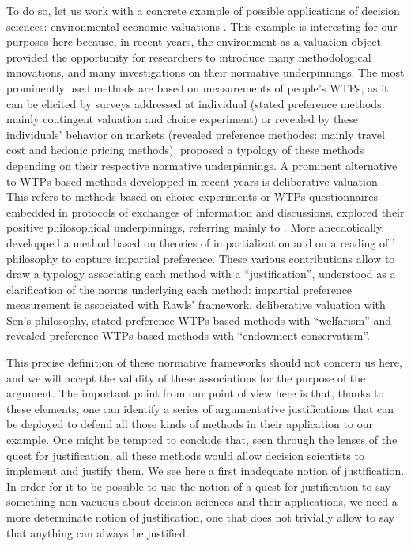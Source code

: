 \documentclass[preprint, french, english, 11pt, authoryear]{elsarticle}%
\begin{document}
To do so, let us work with a concrete example of possible applications of decision sciences: environmental economic valuations \citep{kontoleon_biodiversity_2007}. This example is interesting for our purposes here because, in recent years, the environment as a valuation object provided the opportunity for researchers to introduce many methodological innovations, and many investigations on their normative underpinnings. The most prominently used methods are based on measurements of people's \acp{WTP}, as it can be elicited by surveys addressed at individual (stated preference methods: mainly contingent valuation and choice experiment) or revealed by these individuals' behavior on markets (revealed preference methodes: mainly travel cost and hedonic pricing methods). \citet{meinard_ethical_2016} proposed a typology of these methods depending on their respective normative underpinnings. A prominent alternative to \acp{WTP}-based methods developped in recent years is deliberative valuation \citep{bartkowski_economic_2017}. This refers to methods based on choice-experiments or \acp{WTP} questionnaires embedded in protocols of exchanges of information and discussions. \citet{bartkowski_beyond_2018} explored their positive philosophical underpinnings, referring mainly to \citet{sen_idea_2009}. More anecdotically, \citet{meinard_measuring_2017} developped a method based on theories of impartialization \citep{kolm_macrojustice:_2004}and on a reading of \citet{rawls_theory_1999}' philosophy to capture impartial preference. These various contributions allow to draw a typology associating each method with a ``justification'', understood as a clarification of the norms underlying each method: impartial preference measurement is associated with Rawls' framework, deliberative valuation with Sen's philosophy, stated preference  \acp{WTP}-based methods with ``welfarism'' and revealed preference  \acp{WTP}-based methods with ``endowment conservatism''.

This precise definition of these normative frameworks should not concern us here, and we will accept the validity of these associations for the purpose of the argument. The important point from our point of view here is that, thanks to these elements, one can identify a series of argumentative justifications that can be deployed to defend all those kinds of methods in their application to our example. One might be tempted to conclude that, seen through the lenses of the quest for justification, all these methods would allow decision scientists to implement and justify them. We see here a first inadequate notion of justification. In order for it to be possible to use the notion of a quest for justification to say something non-vacuous about decision sciences and their applications, we need a more determinate notion of justification, one that does not trivially allow to say that anything can always be justified.
\end{document}
